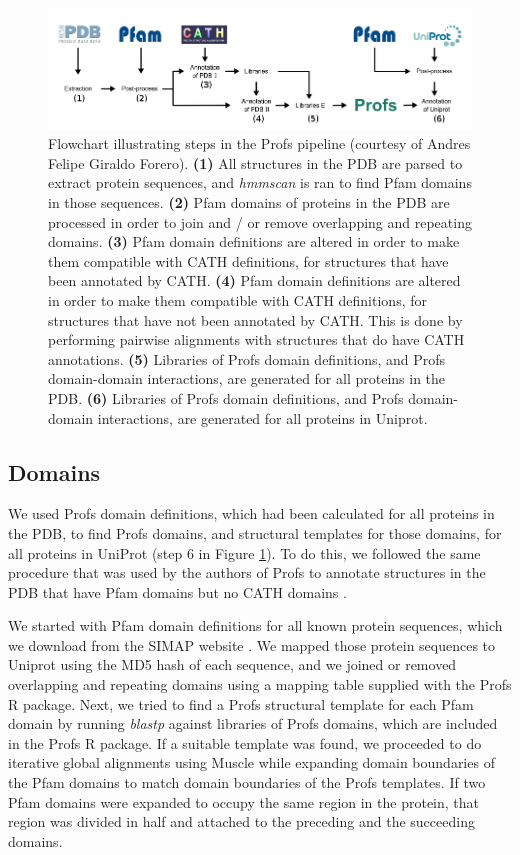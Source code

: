 \begin{figure}[t]
	\centering
	\includegraphics[width=1.0\linewidth]{static/profs/profs_pipeline.png}
	\caption[Profs pipeline.]{Flowchart illustrating steps in the Profs pipeline (courtesy of Andres Felipe Giraldo Forero). \textbf{(1)} All structures in the PDB are parsed to extract protein sequences, and \textit{hmmscan} is ran to find Pfam domains in those sequences. \textbf{(2)} Pfam domains of proteins in the PDB are processed in order to join and / or remove overlapping and repeating domains. \textbf{(3)} Pfam domain definitions are altered in order to make them compatible with CATH definitions, for structures that have been annotated by CATH. \textbf{(4)} Pfam domain definitions are altered in order to make them compatible with CATH definitions, for structures that have not been annotated by CATH. This is done by performing pairwise alignments with structures that do have CATH annotations. \textbf{(5)} Libraries of Profs domain definitions, and Profs domain-domain interactions, are generated for all proteins in the PDB.  \textbf{(6)} Libraries of Profs domain definitions, and Profs domain-domain interactions, are generated for all proteins in Uniprot.}
	\label{fig:profs_pipeline}
\end{figure}


\subsection{Domains}

We used Profs domain definitions, which had been calculated for all proteins in the PDB, to find Profs domains, and structural templates for those domains, for all proteins in UniProt (step 6 in Figure \ref{fig:profs_pipeline}). To do this, we followed the same procedure that was used by the authors of Profs to annotate structures in the PDB that have Pfam domains but no CATH domains \cite{witvliet_elaspic_2016}.

We started with Pfam domain definitions for all known protein sequences, which we download from the SIMAP website \cite{rattei_simapcomprehensive_2010}. We mapped those protein sequences to Uniprot using the MD5 hash of each sequence, and we joined or removed overlapping and repeating domains using a mapping table supplied with the Profs R package. Next, we tried to find a Profs structural template for each Pfam domain by running \textit{blastp} against libraries of Profs domains, which are included in the Profs R package. If a suitable template was found, we proceeded to do iterative global alignments using Muscle \cite{edgar_muscle:_2004} while expanding domain boundaries of the Pfam domains to match domain boundaries of the Profs templates. If two Pfam domains were expanded to occupy the same region in the protein, that region was divided in half and attached to the preceding and the succeeding domains.

